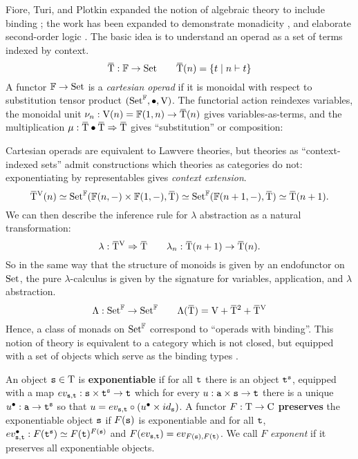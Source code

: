 \documentclass[stthol.tex]{subfiles}
\begin{document}
Fiore, Turi, and Plotkin expanded the notion of algebraic theory to include binding \cite{abssyn}; the work has been expanded to demonstrate monadicity \cite{soats}, and elaborate second-order logic \cite{hur}. The basic idea is to understand an operad as a set of terms indexed by context.
$$\ob{\T}: \F\to \Set \hspace{2em} \ob{\T}(n) = \{t \; | \; n\vdash t\}$$
A functor $\mathbb{F}\to\mathrm{Set}$ is a \textit{cartesian operad} if it is monoidal with respect to substitution tensor product $(\mathrm{Set}^{\mathbb{F}},\bullet,\mathrm{V})$. The functorial action reindexes variables, the monoidal unit $\nu_n:\V(n)=\F(1,n)\to \ob{\T}(n)$ gives variables-as-terms, and the multiplication
$\mu:\ob{\T}\bullet\ob{\T}\Rightarrow \ob{\T}$ gives ``substitution'' or composition:

Cartesian operads are equivalent to Lawvere theories, but theories as ``context-indexed sets'' admit constructions which theories as categories do not: exponentiating by representables gives \textit{context extension}.
$$\ob{\T}^{\V}(n)\simeq \Set^\F(\F(n,-)\times \F(1,-),\ob{\T}) \simeq \Set^\F(\F(n+1,-),\ob{\T}) \simeq \ob{\T}(n+1).$$
We can then describe the inference rule for $\lambda$ abstraction as a natural transformation:
$$\lambda:\ob{\T}^\V\Rightarrow \ob{\T} \hspace{2em} \lambda_n: \ob{\T}(n+1)\to \ob{\T}(n).$$
So in the same way that the structure of monoids is given by an endofunctor on $\mathrm{Set}$, the pure $\lambda$-calculus is given by the signature for variables, application, and $\lambda$ abstraction.
$$\Lambda:\Set^\F\to \Set^\F \hspace{2em} \Lambda(\ob{\T}) = \V+\ob{\T}^2+\ob{\T}^\V$$
Hence, a class of monads on $\mathrm{Set}^{\mathbb{F}}$ correspond to ``operads with binding''. This notion of theory is equivalent to a category which is not closed, but equipped with a set of objects which serve as the binding types \cite{soats}.

\begin{definition}
  An object $\mathtt{s}\in \mathrm{T}$ is \textbf{exponentiable} if for all $\mathtt{t}$ there is an object $\mathtt{t}^{\mathtt{s}}$, equipped with a map $ev_{\mathtt{s},\mathtt{t}}:\mathtt{s}\times \mathtt{t}^{\mathtt{s}} \to \mathtt{t}$ which for every $u:\mathtt{a}\times \mathtt{s}\to \mathtt{t}$ there is a unique $u^\bullet:\mathtt{a}\to \mathtt{t}^{\mathtt{s}}$ so that $u=ev_{\mathtt{s},\mathtt{t}}\circ (u^\bullet\times id_{\mathtt{s}})$.
  A functor $F:\mathrm{T}\to \mathrm{C}$ \textbf{preserves} the exponentiable object $\mathtt{s}$ if $F(\mathtt{s})$ is exponentiable and for all $\mathtt{t}$, $ev^\bullet_{\mathtt{s},\mathtt{t}}:F(\mathtt{t}^{\mathtt{s}})\simeq F(\mathtt{t})^{F(\mathtt{s})}$ and $F(ev_{\mathtt{s},\mathtt{t}})=ev_{F(\mathtt{s}),F(\mathtt{t})}$. We call $F$ \textit{exponent} if it preserves all exponentiable objects.
\end{definition}
\end{document}
